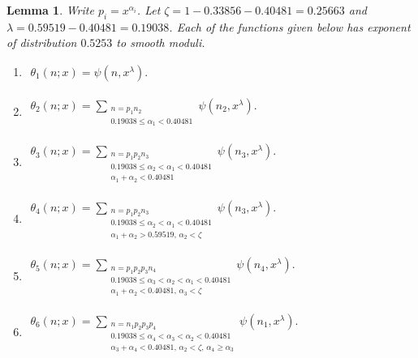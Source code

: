 \documentclass{amsart}
\newtheorem{lemma}{Lemma}
\numberwithin{equation}{section}
\begin{document}
\begin{lemma}\label{lem:goodsiftedsets}  Write $p_i =x^{\alpha_i}$. Let $\zeta = 1-0.33856-0.40481 = 0.25663$ and $\lambda = 0.59519-0.40481=0.19038 $. 
Each of the functions given below has exponent of distribution $0.5253$ to smooth moduli. 
\vspace{3mm}

\begin{enumerate}
\item[\rm{(1)}] \hspace{45mm} $\begin{aligned}\theta_1(n;x)=\psi(n, x^\lambda).\end{aligned}$ \vspace{2mm}
\item[\rm{(2)}] \hspace{45mm} $\begin{aligned}\theta_2(n;x)=\sum_{\substack{ n=p_1n_2 \\ 0.19038 \leq \alpha_1 < 0.40481}} \psi(n_2, x^\lambda).\end{aligned}$ \vspace{2mm}
\item[\rm{(3)}] \hspace{45mm} $\begin{aligned}\theta_3(n;x)=\sum_{\substack{ n=p_1p_2n_3 \\ 0.19038 \leq \alpha_2 <  \alpha_1 < 0.40481 \\ \alpha_1 + \alpha_2 < 0.40481}} \psi(n_3, x^\lambda).\end{aligned}$ \vspace{2mm}
\item[\rm{(4)}] \hspace{45mm} $\begin{aligned}\theta_4(n;x)=\sum_{\substack{ n=p_1p_2n_3 \\ 0.19038 \leq \alpha_2 <  \alpha_1 < 0.40481 \\ \alpha_1 + \alpha_2 > 0.59519,\, \alpha_2 <\zeta}} \psi(n_3, x^\lambda).\end{aligned}$ \vspace{2mm}
\item[\rm{(5)}] \hspace{45mm} $\begin{aligned}\theta_5(n;x)=\sum_{\substack{ n=p_1p_2p_3n_4 \\ 0.19038 \leq \alpha_3 < \alpha_2 <  \alpha_1 < 0.40481 \\ \alpha_1 + \alpha_2 < 0.40481,\, \alpha_3 <\zeta}} \psi(n_4, x^\lambda).\end{aligned}$ \vspace{2mm}
\item[\rm{(6)}] \hspace{45mm} $\begin{aligned}\theta_6(n;x)=\sum_{\substack{ n=n_1p_2p_3p_4 \\ 0.19038 \leq \alpha_4 < \alpha_3 <  \alpha_2 < 0.40481 \\ \alpha_3 + \alpha_4 < 0.40481,\, \alpha_2 <\zeta, \, \alpha_4 \geq \alpha_3}} \psi(n_1, x^\lambda).\end{aligned}$ \vspace{2mm}
\end{enumerate}
\end{lemma}
\end{document}
